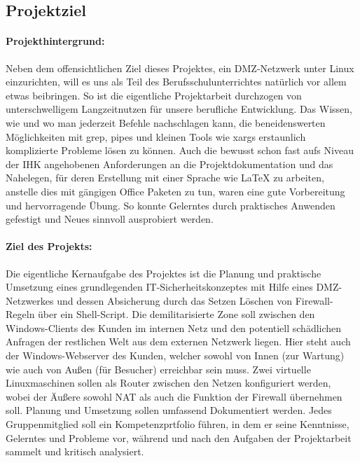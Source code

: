 \subsection{Projektziel} 
\label{sec:Projektziel}
\paragraph*{Projekthintergrund: } Neben dem offensichtlichen Ziel dieses Projektes, ein \ac{DMZ}-Netzwerk unter Linux einzurichten, will es uns als Teil des Berufsschulunterrichtes natürlich vor allem etwas beibringen. So ist die eigentliche Projektarbeit durchzogen von unterschwelligem Langzeitnutzen für unsere berufliche Entwicklung. Das Wissen, wie und wo man jederzeit Befehle nachschlagen kann, die beneidenswerten Möglichkeiten mit grep, pipes und kleinen Tools wie xargs erstaunlich komplizierte Probleme lösen zu können. Auch die bewusst schon fast aufs Niveau der \ac{IHK} angehobenen Anforderungen an die Projektdokumentation und das Nahelegen, für deren Erstellung mit einer Sprache wie \LaTeX{} zu arbeiten, anstelle dies mit gängigen Office Paketen zu tun, waren eine gute Vorbereitung und hervorragende Übung. So konnte Gelerntes durch praktisches Anwenden gefestigt und Neues sinnvoll ausprobiert werden. 
\paragraph*{Ziel des Projekts: } Die eigentliche Kernaufgabe des Projektes ist die Planung und praktische Umsetzung eines grundlegenden \ac{IT}-Sicherheitskonzeptes mit Hilfe eines \ac{DMZ}-Netzwerkes und dessen Absicherung durch das Setzen \bzw Löschen von Firewall-Regeln über ein Shell-Script. Die demilitarisierte Zone soll zwischen den Windows-Clients des Kunden im internen Netz und den potentiell schädlichen Anfragen der restlichen Welt aus dem externen Netzwerk liegen. Hier steht auch der Windows-Webserver des Kunden, welcher sowohl von Innen (zur Wartung) wie auch von Außen (für Besucher) erreichbar sein muss. Zwei virtuelle Linuxmaschinen sollen als Router zwischen den Netzen konfiguriert werden, wobei der Äußere sowohl \ac{NAT} als auch die Funktion der Firewall übernehmen soll. Planung und Umsetzung sollen umfassend Dokumentiert werden. Jedes Gruppenmitglied soll ein Kompetenzprtfolio führen, in dem er seine Kenntnisse, Gelerntes und Probleme vor, während und nach den Aufgaben der Projektarbeit sammelt und kritisch analysiert.


